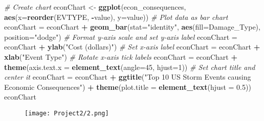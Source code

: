 \documentclass[]{article}
\newenvironment{Shaded}{\begin{snugshade}}{\end{snugshade}}
\newcommand{\KeywordTok}[1]{\textcolor[rgb]{0.13,0.29,0.53}{\textbf{#1}}}
\newcommand{\DataTypeTok}[1]{\textcolor[rgb]{0.13,0.29,0.53}{#1}}
\newcommand{\DecValTok}[1]{\textcolor[rgb]{0.00,0.00,0.81}{#1}}
\newcommand{\FloatTok}[1]{\textcolor[rgb]{0.00,0.00,0.81}{#1}}
\newcommand{\StringTok}[1]{\textcolor[rgb]{0.31,0.60,0.02}{#1}}
\newcommand{\CommentTok}[1]{\textcolor[rgb]{0.56,0.35,0.01}{\textit{#1}}}
\newcommand{\OperatorTok}[1]{\textcolor[rgb]{0.81,0.36,0.00}{\textbf{#1}}}
\newcommand{\NormalTok}[1]{#1}
\begin{document}
\begin{Shaded}
\begin{Highlighting}[]
\CommentTok{# Create chart}
\NormalTok{econChart <-}\StringTok{ }\KeywordTok{ggplot}\NormalTok{(econ_consequences, }\KeywordTok{aes}\NormalTok{(}\DataTypeTok{x=}\KeywordTok{reorder}\NormalTok{(EVTYPE, }\OperatorTok{-}\NormalTok{value), }\DataTypeTok{y=}\NormalTok{value))}
\CommentTok{# Plot data as bar chart}
\NormalTok{econChart =}\StringTok{ }\NormalTok{econChart }\OperatorTok{+}\StringTok{ }\KeywordTok{geom_bar}\NormalTok{(}\DataTypeTok{stat=}\StringTok{"identity"}\NormalTok{, }\KeywordTok{aes}\NormalTok{(}\DataTypeTok{fill=}\NormalTok{Damage_Type), }\DataTypeTok{position=}\StringTok{"dodge"}\NormalTok{)}
\CommentTok{# Format y-axis scale and set y-axis label}
\NormalTok{econChart =}\StringTok{ }\NormalTok{econChart }\OperatorTok{+}\StringTok{ }\KeywordTok{ylab}\NormalTok{(}\StringTok{"Cost (dollars)"}\NormalTok{) }
\CommentTok{# Set x-axis label}
\NormalTok{econChart =}\StringTok{ }\NormalTok{econChart }\OperatorTok{+}\StringTok{ }\KeywordTok{xlab}\NormalTok{(}\StringTok{"Event Type"}\NormalTok{) }
\CommentTok{# Rotate x-axis tick labels }
\NormalTok{econChart =}\StringTok{ }\NormalTok{econChart }\OperatorTok{+}\StringTok{ }\KeywordTok{theme}\NormalTok{(}\DataTypeTok{axis.text.x =} \KeywordTok{element_text}\NormalTok{(}\DataTypeTok{angle=}\DecValTok{45}\NormalTok{, }\DataTypeTok{hjust=}\DecValTok{1}\NormalTok{))}
\CommentTok{# Set chart title and center it}
\NormalTok{econChart =}\StringTok{ }\NormalTok{econChart }\OperatorTok{+}\StringTok{ }\KeywordTok{ggtitle}\NormalTok{(}\StringTok{"Top 10 US Storm Events causing Economic Consequences"}\NormalTok{) }\OperatorTok{+}\StringTok{ }\KeywordTok{theme}\NormalTok{(}\DataTypeTok{plot.title =} \KeywordTok{element_text}\NormalTok{(}\DataTypeTok{hjust =} \FloatTok{0.5}\NormalTok{))}
\NormalTok{econChart}
\end{Highlighting}
\end{Shaded}

\begin{figure}
\centering
\texttt{[image: Project2/2.png]}
\caption{}
\end{figure}
\end{document}
